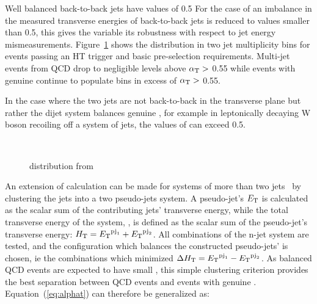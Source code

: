 Well balanced back-to-back jets have \alphat values of 0.5 
For the case of an imbalance in the measured transverse energies 
of back-to-back jets \alphat is reduced to values smaller than 0.5, 
this gives the variable its robustness with respect to jet energy 
mismeasurements. Figure~\ref{fig:alphat_dist} shows the \alphat 
distribution in two jet multiplicity bins for events passing 
an HT trigger and basic pre-selection requirements. Multi-jet 
events from QCD drop to negligible levels above $\alpha_{\text{T}}>$ 0.55
while events with genuine \met continue to populate bins in excess
of  $\alpha_{\text{T}}>$ 0.55.

In the case where the two 
jets are not back-to-back in the transverse plane but rather the 
dijet system balances genuine \met, for example in leptonically 
decaying W boson recoiling off a system of jets, the values of 
\alphat can exceed 0.5.

\begin{figure}[h!t]
  \begin{center}
     \\
    \caption{\alphat distribution from~\cite{RA1Paper2012} }
    \label{fig:alphat_dist}
  \end{center}
\end{figure}

An extension of \alphat calculation can be made for systems of 
more than two jets~\cite{cms-pas-sus-09001} by clustering the jets into a 
two pseudo-jets system. A pseudo-jet's ${E_{\text T}}$ is calculated
as the scalar sum of the contributing jets' transverse energy, while the total
transverse energy of the system, \scalht, is defined as the scalar sum of the 
pseudo-jet's transverse energy: $\mbox{$H_\text{T}$} = {E_{\text T}}^{{\rm pj}_1}+{E_{\text T}}^{{\rm pj}_2}$.
All combinations of the n-jet system are tested, and the configuration which
balances the constructed pseudo-jets' \Et is chosen, ie the combinations which
minimized $\Delta\mbox{$H_\text{T}$} = {E_{\text T}}^{{\rm pj}_1}-{E_{\text T}}^{{\rm pj}_2}$. As balanced QCD events
are expected to have small \dht, this simple clustering criterion provides the best
separation between QCD events and events with genuine \met. 
Equation~(\ref{eq:alphat}) can therefore be generalized as:


